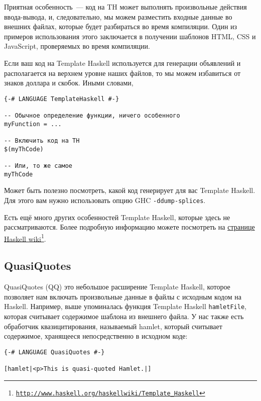 Приятная особенность~--- код на TH может выполнять произвольные действия ввода-вывода, и, следовательно, мы можем разместить входные данные во внешних файлах, которые будет разбираться во время компиляции. Один из примеров использования этого заключается в получении шаблонов HTML, CSS и JavaScript, проверяемых во время компиляции.

Если ваш код на Template Haskell используется для генерации объявлений и располагается на верхнем уровне наших файлов, то мы можем избавиться от знаков доллара и скобок. Иными словами,

\begin{lstlisting}
{-# LANGUAGE TemplateHaskell #-}

-- Обычное определение функции, ничего особенного
myFunction = ...

-- Включить код на TH
$(myThCode)

-- Или, то же самое
myThCode
\end{lstlisting}

Может быть полезно посмотреть, какой код генерирует для вас Template Haskell. Для этого вам нужно использовать опцию GHC \texttt{-ddump-splices}.

\begin{remark}
Есть ещё много других особенностей Template Haskell, которые здесь не рассматриваются. Более подробную информацию можете посмотреть на \href{http://www.haskell.org/haskellwiki/Template\_Haskell}{странице Haskell wiki}\footnote{\href{http://www.haskell.org/haskellwiki/Template\_Haskell}{\texttt{http://www.haskell.org/haskellwiki/Template\_Haskell}}}.
\end{remark}

\subsection{QuasiQuotes}

QuasiQuotes (QQ) это небольшое расширение Template Haskell, которое позволяет нам включать произвольные данные в файлы с исходным кодом на Haskell. Например, выше упоминалась функция Template Haskell \lstinline'hamletFile', которая считывает содержимое шаблона из внешнего файла. У нас также есть обработчик квазицитирования, называемый hamlet, который считывает содержимое, хранящееся непосредственно в исходном коде:

\begin{lstlisting}
{-# LANGUAGE QuasiQuotes #-}

[hamlet|<p>This is quasi-quoted Hamlet.|]
\end{lstlisting}

